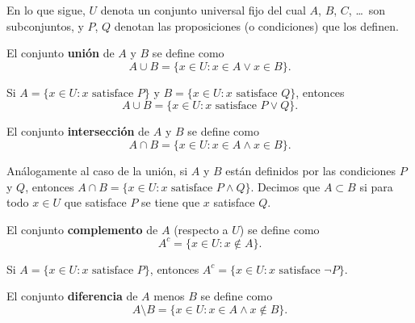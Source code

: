 \documentclass[12pt,a4paper]{book}
\begin{document}
    En lo que sigue, $U$ denota un conjunto universal fijo del cual $A$, $B$, $C$, \dots\ son subconjuntos, y $P$, $Q$ denotan las proposiciones (o condiciones) que los definen.

    \begin{definicion}[Unión]
        El conjunto \textbf{unión} de $A$ y $B$ se define como
        \begin{equation*}
            A\cup B = \{x\in U : x\in A \vee x\in B\}.
        \end{equation*}
    \end{definicion}

    \begin{ejemplo}
        Si $A=\{x\in U : x \text{ satisface } P\}$ y $B=\{x\in U : x \text{ satisface } Q\}$, entonces
        \begin{equation*}
            A\cup B = \{x\in U : x \text{ satisface } P \vee Q\}.
        \end{equation*}
    \end{ejemplo}

    \begin{definicion}[Intersección]
        El conjunto \textbf{intersección} de $A$ y $B$ se define como
        \begin{equation*}
            A\cap B = \{x\in U : x\in A \wedge x\in B\}.
        \end{equation*}
    \end{definicion}

    Análogamente al caso de la unión, si $A$ y $B$ están definidos por las condiciones $P$ y $Q$, entonces $A\cap B = \{x\in U : x \text{ satisface } P\wedge Q\}$. Decimos que $A\subset B$ si para todo $x\in U$ que satisface $P$ se tiene que $x$ satisface $Q$.

    \begin{definicion}[Complemento]
        El conjunto \textbf{complemento} de $A$ (respecto a $U$) se define como
        \begin{equation*}
            A^c = \{x\in U : x\notin A\}.
        \end{equation*}
    \end{definicion}

    Si $A=\{x\in U : x \text{ satisface } P\}$, entonces $A^c = \{x\in U : x \text{ satisface } \neg P\}$.

    \begin{definicion}[Diferencia]
        El conjunto \textbf{diferencia} de $A$ menos $B$ se define como
        \begin{equation*}
            A\setminus B = \{x\in U : x\in A \wedge x\notin B\}.
        \end{equation*}
    \end{definicion}
\end{document}
